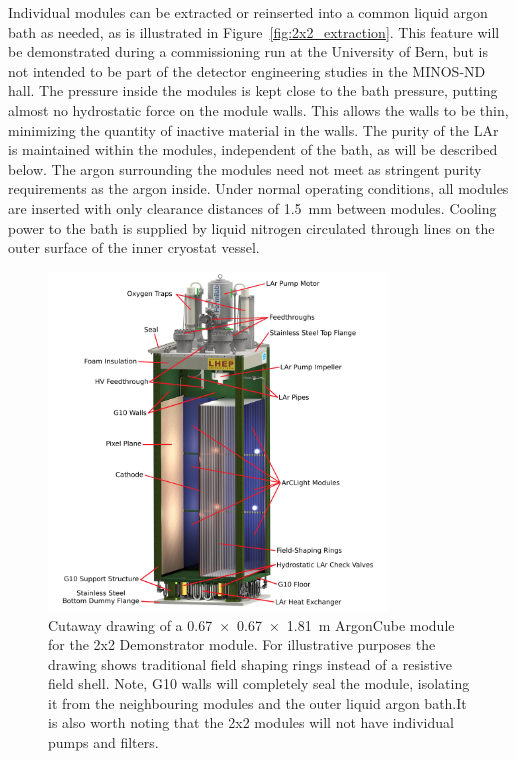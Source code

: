 Individual modules can be extracted or reinserted into a common liquid argon bath as needed, as is illustrated in Figure~\ref{fig:2x2_extraction}. This feature will be demonstrated during a commissioning run at the University of Bern, but is not intended to be part of the detector engineering studies in the MINOS-ND hall. The pressure inside the modules is kept close to the bath pressure, putting almost no hydrostatic force on the module walls.  This allows the walls to be thin, minimizing the quantity of inactive material in the walls. The purity of the LAr is maintained within the modules, independent of the bath, as will be described below. The argon surrounding the modules need not meet as stringent purity requirements as the argon inside. Under normal operating conditions, all modules are inserted with only clearance distances of \SI{1.5}{\milli\metre} between modules. Cooling power to the bath is supplied by liquid nitrogen circulated through lines on the outer surface of the inner cryostat vessel.

\begin{figure}[tbp]
	\centering
	\includegraphics[width=0.8\textwidth]{graphics/Normal-Module-4K_labelled.jpeg}
	\caption[ArgonCube module engineering drawing]{Cutaway drawing of a \SI{0.67 x 0.67 x 1.81}{\metre} ArgonCube module for the 2x2 Demonstrator module. For illustrative purposes the drawing shows traditional field shaping rings instead of a resistive field shell. Note, G10 walls will completely seal the module, isolating it from the neighbouring modules and the outer liquid argon bath.It is also worth noting that the 2x2 modules will not have individual pumps and filters.}
	\label{fig:ac_module}
\end{figure}

